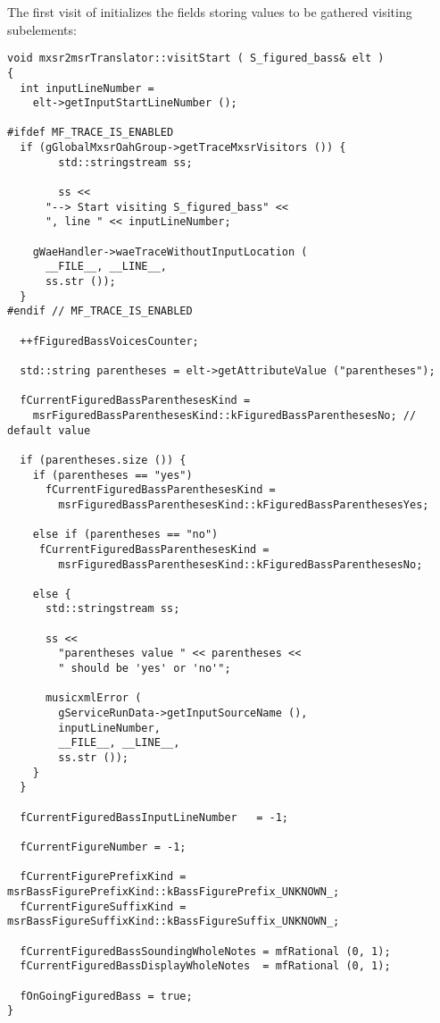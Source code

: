 The first visit of  initializes the fields storing values to be gathered visiting subelements:
\begin{lstlisting}[language=CPlusPlus]
void mxsr2msrTranslator::visitStart ( S_figured_bass& elt )
{
  int inputLineNumber =
    elt->getInputStartLineNumber ();

#ifdef MF_TRACE_IS_ENABLED
  if (gGlobalMxsrOahGroup->getTraceMxsrVisitors ()) {
		std::stringstream ss;

		ss <<
      "--> Start visiting S_figured_bass" <<
      ", line " << inputLineNumber;

    gWaeHandler->waeTraceWithoutInputLocation (
      __FILE__, __LINE__,
      ss.str ());
  }
#endif // MF_TRACE_IS_ENABLED

  ++fFiguredBassVoicesCounter;

  std::string parentheses = elt->getAttributeValue ("parentheses");

  fCurrentFiguredBassParenthesesKind =
    msrFiguredBassParenthesesKind::kFiguredBassParenthesesNo; // default value

  if (parentheses.size ()) {
    if (parentheses == "yes")
      fCurrentFiguredBassParenthesesKind =
        msrFiguredBassParenthesesKind::kFiguredBassParenthesesYes;

    else if (parentheses == "no")
     fCurrentFiguredBassParenthesesKind =
        msrFiguredBassParenthesesKind::kFiguredBassParenthesesNo;

    else {
      std::stringstream ss;

      ss <<
        "parentheses value " << parentheses <<
        " should be 'yes' or 'no'";

      musicxmlError (
        gServiceRunData->getInputSourceName (),
        inputLineNumber,
        __FILE__, __LINE__,
        ss.str ());
    }
  }

  fCurrentFiguredBassInputLineNumber   = -1;

  fCurrentFigureNumber = -1;

  fCurrentFigurePrefixKind = msrBassFigurePrefixKind::kBassFigurePrefix_UNKNOWN_;
  fCurrentFigureSuffixKind = msrBassFigureSuffixKind::kBassFigureSuffix_UNKNOWN_;

  fCurrentFiguredBassSoundingWholeNotes = mfRational (0, 1);
  fCurrentFiguredBassDisplayWholeNotes  = mfRational (0, 1);

  fOnGoingFiguredBass = true;
}
\end{lstlisting}


